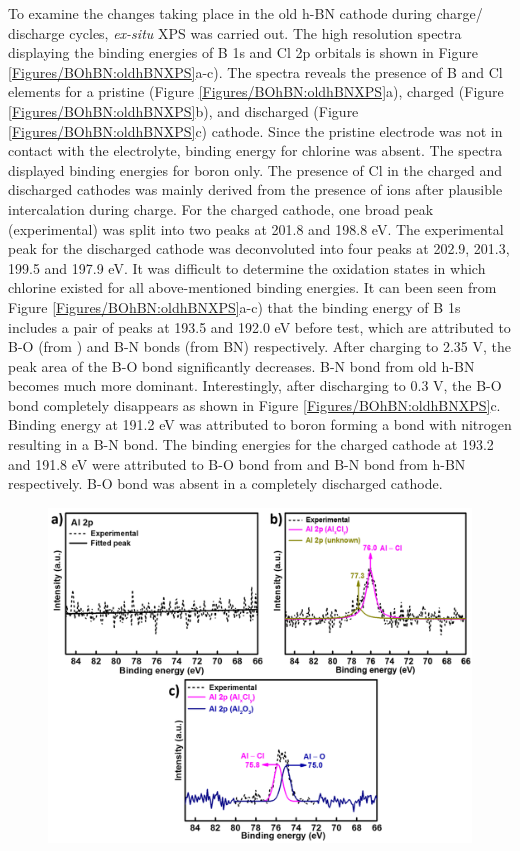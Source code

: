 To examine the changes taking place in the old h-BN cathode during charge/ discharge cycles, \textit{ex-situ} XPS was carried out. The high resolution spectra displaying the binding energies of B 1s and Cl 2p orbitals is shown in Figure \ref{Figures/BOhBN:oldhBNXPS}a-c). The spectra reveals the presence of B and Cl elements for a pristine (Figure \ref{Figures/BOhBN:oldhBNXPS}a), charged (Figure \ref{Figures/BOhBN:oldhBNXPS}b), and discharged (Figure \ref{Figures/BOhBN:oldhBNXPS}c) cathode. Since the pristine electrode was not in contact with the electrolyte, binding energy for chlorine was absent. The spectra displayed binding energies for boron only. The presence of Cl in the charged and discharged cathodes was mainly derived from the presence of  ions after plausible intercalation during charge. For the charged cathode, one broad peak (experimental) was split into two peaks at 201.8 and 198.8 eV. The experimental peak for the discharged cathode was deconvoluted into four peaks at 202.9, 201.3, 199.5 and 197.9 eV. It was difficult to determine the oxidation states in which chlorine existed for all above-mentioned binding energies. It can been seen from Figure \ref{Figures/BOhBN:oldhBNXPS}a-c) that the binding energy of B 1s includes a pair of peaks at 193.5 and 192.0 eV before test, which are attributed to B-O (from ) and B-N bonds (from BN) respectively. After charging to 2.35 V, the peak area of the B-O bond significantly decreases. B-N bond from old h-BN becomes much more dominant. Interestingly, after discharging to 0.3 V, the B-O bond completely disappears as shown in Figure \ref{Figures/BOhBN:oldhBNXPS}c. Binding energy at 191.2 eV was attributed to boron forming a bond with nitrogen resulting in a B-N bond. The binding energies for the charged cathode at 193.2 and 191.8 eV were attributed to B-O bond from  and B-N bond from h-BN respectively. B-O bond was absent in a completely discharged cathode. 

\begin{figure}[tbh!]
\centering
\includegraphics[width=\textwidth]{Figures/BOhBN/hBNAlXPS}
\caption{}
\label{Figures/BOhBN:hBNAlXPS}
\end{figure}

